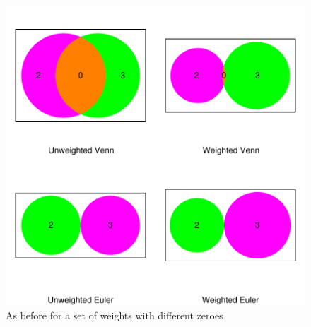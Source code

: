 \documentclass[a4paper]{article}
\begin{document}
\begin{figure}[H]\begin{center}
\includegraphics{Vennfig-p2no11threef}
\caption{As before for a set of weights with different zeroes}
\end{center}\end{figure}
\end{document}
